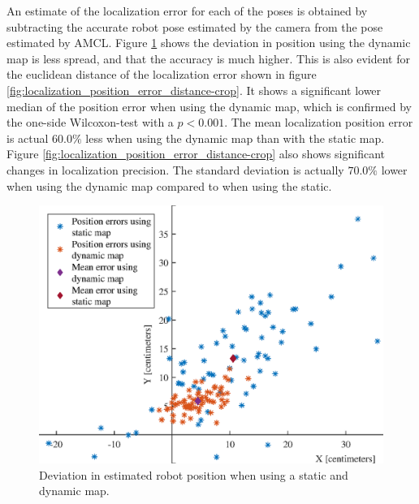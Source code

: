 An estimate of the localization error for each of the poses is obtained by subtracting the accurate robot pose estimated by the camera from the pose estimated by AMCL.
Figure \ref{fig:precision_test_positions} shows the deviation in position using the dynamic map is less spread, and that the accuracy is much higher.
This is also evident for the euclidean distance of the localization error shown in figure \ref{fig:localization_position_error_distance-crop}. 
It shows a significant lower median of the position error when using the dynamic map, which is confirmed by the one-side Wilcoxon-test with a $p<0.001$.
The mean localization position error is actual $60.0\%$ less when using the dynamic map than with the static map.
Figure \ref{fig:localization_position_error_distance-crop} also shows significant changes in localization precision. 
The standard deviation is actually $70.0\%$ lower when using the dynamic map compared to when using the static.

\begin{figure}
    \centering
    \includegraphics[scale=1]{chapters/evaluation/figures/Localization_position_errors}
    \caption{Deviation in estimated robot position when using a static and dynamic map.}
    \label{fig:precision_test_positions}
\end{figure}

